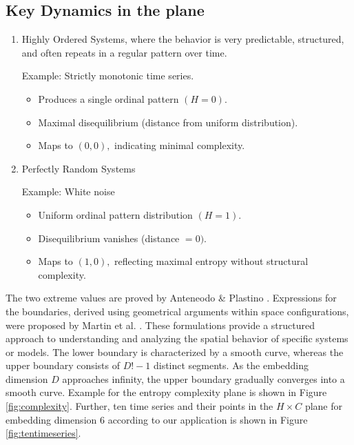 \subsection{Key Dynamics in the plane}
\begin{enumerate}
	\item Highly Ordered Systems, where the behavior is very predictable, structured, and often repeats in a regular pattern over time.
	
	Example: Strictly monotonic time series.
	\begin{itemize}
		\item Produces a single ordinal pattern $(H=0)$.
		
		\item Maximal disequilibrium (distance from uniform distribution).
		
		\item Maps to $(0,0),$ indicating minimal complexity.
	\end{itemize}
	
	\item Perfectly Random Systems
	
	Example: White noise
	\begin{itemize}
		\item Uniform ordinal pattern distribution $(H=1)$.
		\item Disequilibrium vanishes (distance $=0)$.
		\item Maps to $(1,0),$ reflecting maximal entropy without structural complexity.
	\end{itemize}
\end{enumerate}
The two extreme values are proved by Anteneodo \& Plastino \cite{anteneodo1996some}.
Expressions for the boundaries, derived using geometrical arguments within space configurations, were proposed by Martin et al. \cite{Martin2006}. 
These formulations provide a structured approach to understanding and analyzing the spatial behavior of specific systems or models. The lower boundary is characterized by a smooth curve, whereas the upper boundary consists of $D!-1$ distinct segments. As the embedding dimension $D$ approaches infinity, the upper boundary gradually converges into a smooth curve. 
Example for the entropy complexity plane is shown in Figure \ref{fig:complexity}. Further, ten time series and their points in the $H \times C$ plane for embedding dimension 6 according to our application is shown in Figure \ref{fig:tentimeseries}.


